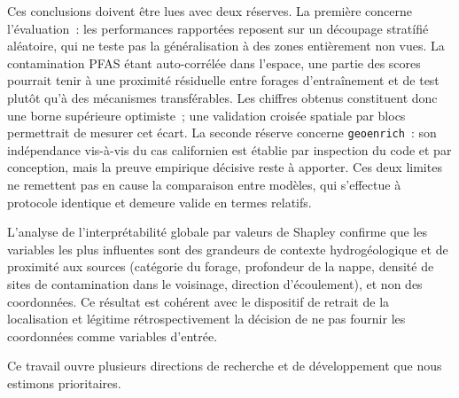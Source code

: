 Ces conclusions doivent \^etre lues avec deux r\'eserves. La premi\`ere concerne l'\'evaluation~: les performances rapport\'ees reposent sur un d\'ecoupage strat\'ifi\'e al\'eatoire, qui ne teste pas la g\'en\'eralisation \`a des zones enti\`erement non vues. La contamination PFAS \'etant auto-corr\'el\'ee dans l'espace, une partie des scores pourrait tenir \`a une proximit\'e r\'esiduelle entre forages d'entra\^inement et de test plut\^ot qu'\`a des m\'ecanismes transf\'erables. Les chiffres obtenus constituent donc une borne sup\'erieure optimiste~; une validation crois\'ee spatiale par blocs permettrait de mesurer cet \'ecart. La seconde r\'eserve concerne \texttt{geoenrich}~: son ind\'ependance vis-\`a-vis du cas californien est \'etablie par inspection du code et par conception, mais la preuve empirique d\'ecisive reste \`a apporter. Ces deux limites ne remettent pas en cause la comparaison entre mod\`eles, qui s'effectue \`a protocole identique et demeure valide en termes relatifs.

L'analyse de l'interpr\'etabilit\'e globale par valeurs de Shapley confirme que les variables les plus influentes sont des grandeurs de contexte hydrog\'eologique et de proximit\'e aux sources (cat\'egorie du forage, profondeur de la nappe, densit\'e de sites de contamination dans le voisinage, direction d'\'ecoulement), et non des coordonn\'ees. Ce r\'esultat est coh\'erent avec le dispositif de retrait de la localisation et l\'egitime r\'etrospectivement la d\'ecision de ne pas fournir les coordonn\'ees comme variables d'entr\'ee.

\label{sec:concl-perspectives}

Ce travail ouvre plusieurs directions de recherche et de d\'eveloppement que nous estimons prioritaires.

